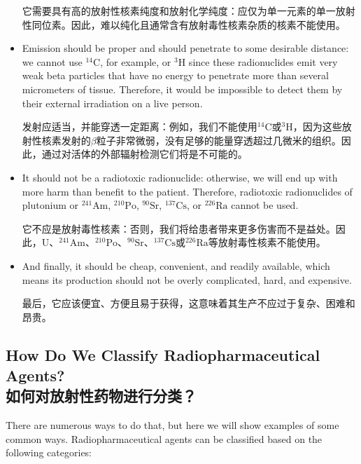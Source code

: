 \documentclass[dvipsnames, svgnames,a4paper,11pt]{article}
\begin{document}
\begin{itemize}
            它需要具有高的放射性核素纯度和放射化学纯度：应仅为单一元素的单一放射性同位素。因此，难以纯化且通常含有放射毒性核素杂质的核素不能使用。

      \item Emission should be proper and should penetrate to some desirable distance: we cannot use ${}^\text{14}\text{C}$, for example, or ${}^\text{3}\text{H}$ since these radionuclides emit very weak beta particles that have no energy to penetrate more than several micrometers of tissue. Therefore, it would be impossible to detect them by their external irradiation on a live person.

            发射应适当，并能穿透一定距离：例如，我们不能使用${}^\text{14}\text{C}$或${}^\text{3}\text{H}$，因为这些放射性核素发射的$\beta$粒子非常微弱，没有足够的能量穿透超过几微米的组织。因此，通过对活体的外部辐射检测它们将是不可能的。

      \item It should not be a radiotoxic radionuclide: otherwise, we will end up with more harm than benefit to the patient. Therefore, radiotoxic radionuclides of plutonium or ${}^\text{241}\text{Am}$, ${}^\text{210}\text{Po}$, ${}^\text{90}\text{Sr}$, ${}^\text{137}\text{Cs}$, or ${}^\text{226}\text{Ra}$ cannot be used.

            它不应是放射毒性核素：否则，我们将给患者带来更多伤害而不是益处。因此，U、${}^\text{241}\text{Am}$、${}^\text{210}\text{Po}$、${}^\text{90}\text{Sr}$、${}^\text{137}\text{Cs}$或${}^\text{226}\text{Ra}$等放射毒性核素不能使用。


      \item And finally, it should be cheap, convenient, and readily available, which means its production should not be overly complicated, hard, and expensive.

            最后，它应该便宜、方便且易于获得，这意味着其生产不应过于复杂、困难和昂贵。


\end{itemize}

\subsection{How Do We Classify Radiopharmaceutical Agents?\\如何对放射性药物进行分类？}

There are numerous ways to do that, but here we will show examples of some common ways. Radiopharmaceutical agents can be classified based on the following categories:  
\end{document}
